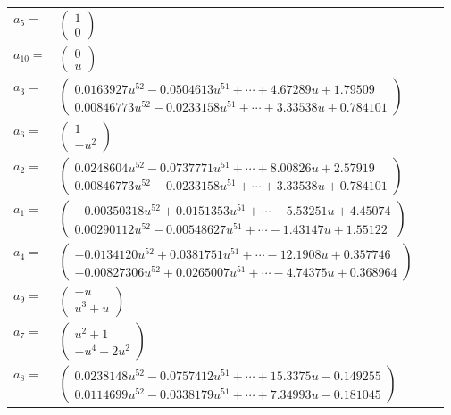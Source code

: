 \documentclass[1p]{elsarticle_modified}
\theoremstyle{definition}
\begin{document}
\begin{tabular}{m{7pt} m{180pt} m{7pt} m{180pt} }
\flushright $a_{5}=$&$\begin{pmatrix}1\\0\end{pmatrix}$ \\
\flushright $a_{10}=$&$\begin{pmatrix}0\\u\end{pmatrix}$ \\
\flushright $a_{3}=$&$\begin{pmatrix}0.0163927 u^{52}-0.0504613 u^{51}+\cdots+4.67289 u+1.79509\\0.00846773 u^{52}-0.0233158 u^{51}+\cdots+3.33538 u+0.784101\end{pmatrix}$ \\
\flushright $a_{6}=$&$\begin{pmatrix}1\\- u^2\end{pmatrix}$ \\
\flushright $a_{2}=$&$\begin{pmatrix}0.0248604 u^{52}-0.0737771 u^{51}+\cdots+8.00826 u+2.57919\\0.00846773 u^{52}-0.0233158 u^{51}+\cdots+3.33538 u+0.784101\end{pmatrix}$ \\
\flushright $a_{1}=$&$\begin{pmatrix}-0.00350318 u^{52}+0.0151353 u^{51}+\cdots-5.53251 u+4.45074\\0.00290112 u^{52}-0.00548627 u^{51}+\cdots-1.43147 u+1.55122\end{pmatrix}$ \\
\flushright $a_{4}=$&$\begin{pmatrix}-0.0134120 u^{52}+0.0381751 u^{51}+\cdots-12.1908 u+0.357746\\-0.00827306 u^{52}+0.0265007 u^{51}+\cdots-4.74375 u+0.368964\end{pmatrix}$ \\
\flushright $a_{9}=$&$\begin{pmatrix}- u\\u^3+u\end{pmatrix}$ \\
\flushright $a_{7}=$&$\begin{pmatrix}u^2+1\\- u^4-2 u^2\end{pmatrix}$ \\
\flushright $a_{8}=$&$\begin{pmatrix}0.0238148 u^{52}-0.0757412 u^{51}+\cdots+15.3375 u-0.149255\\0.0114699 u^{52}-0.0338179 u^{51}+\cdots+7.34993 u-0.181045\end{pmatrix}$ \\

\end{tabular}
\end{document}
